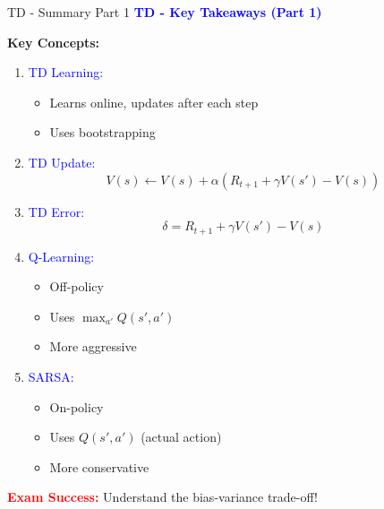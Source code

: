 \documentclass[8pt]{beamer}
\begin{document}
\begin{frame}{TD - Summary Part 1}
\fontsize{6.5}{7.5}\selectfont
\textcolor{blue}{\textbf{TD - Key Takeaways (Part 1)}}

\textbf{Key Concepts:}
\begin{enumerate}
\item \textcolor{blue}{TD Learning:}
\begin{itemize}
\item Learns online, updates after each step
\item Uses bootstrapping
\end{itemize}

\item \textcolor{blue}{TD Update:}
\[
V(s) \leftarrow V(s) + \alpha(R_{t+1} + \gamma V(s') - V(s))
\]

\item \textcolor{blue}{TD Error:}
\[
\delta = R_{t+1} + \gamma V(s') - V(s)
\]

\item \textcolor{blue}{Q-Learning:}
\begin{itemize}
\item Off-policy
\item Uses $\max_{a'} Q(s',a')$
\item More aggressive
\end{itemize}

\item \textcolor{blue}{SARSA:}
\begin{itemize}
\item On-policy
\item Uses $Q(s',a')$ (actual action)
\item More conservative
\end{itemize}
\end{enumerate}

\textcolor{red}{\textbf{Exam Success:}} Understand the bias-variance trade-off!
\end{frame}
\end{document}
